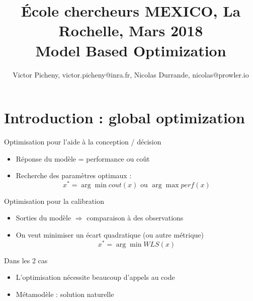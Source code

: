 \documentclass{beamer}
\title[\'Ecole chercheurs MEXICO]{ \small \'Ecole chercheurs MEXICO, La Rochelle, Mars 2018\\ \vspace{3mm} \LARGE Model Based Optimization}
\author[\quad La Rochelle, March 2018]{Victor Picheny, victor.picheny@inra.fr, Nicolas Durrande, nicolas@prowler.io}
\date{\null}
\begin{document}
\begin{frame}
  \titlepage
\end{frame}


\section[Global optim.]{Introduction : global optimization}

\begin{frame}{}
\begin{block}{Optimisation pour l'aide à la conception / décision}
 \begin{itemize}
  \item Réponse du modèle = performance ou coût
  \item Recherche des paramètres optimaux :
  $$x^* = \arg \min cout(x) \text{ ou } \arg \max {perf(x)}$$
   \end{itemize}
\end{block}

\begin{exampleblock}{Optimisation pour la calibration}
 \begin{itemize}
  \item Sorties du modèle $\Rightarrow$ comparaison à des observations
  \item On veut minimiser un écart quadratique (ou autre métrique)
  $$x^* = \arg \min WLS(x)$$
  \end{itemize}
\end{exampleblock}

\begin{alertblock}{Dans les 2 cas}
 \begin{itemize}
  \item L'optimisation nécessite beaucoup d'appels au code
  \item Métamodèle : solution naturelle
 \end{itemize}
\end{alertblock}

\end{frame}
\end{document}
